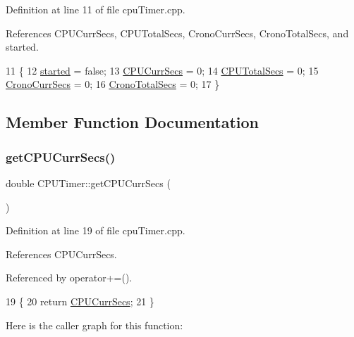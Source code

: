 Definition at line 11 of file cpu\+Timer.\+cpp.



References C\+P\+U\+Curr\+Secs, C\+P\+U\+Total\+Secs, Crono\+Curr\+Secs, Crono\+Total\+Secs, and started.


\begin{DoxyCode}
11                    \{
12     \hyperlink{class_c_p_u_timer_a8fde2f68dd2f4811400429dcf9a4a6c7}{started} = \textcolor{keyword}{false};
13     \hyperlink{class_c_p_u_timer_aa34930f260364d48351fac6f5b926c82}{CPUCurrSecs} = 0;
14     \hyperlink{class_c_p_u_timer_a1f61a2313ec71eb67d658c482420abe7}{CPUTotalSecs} = 0;
15     \hyperlink{class_c_p_u_timer_a5cd38d0e4893710f1c85f1aa03961cbc}{CronoCurrSecs} = 0;
16     \hyperlink{class_c_p_u_timer_a9c8ac2ee9f44e8b4365321698cf17493}{CronoTotalSecs} = 0;
17 \}
\end{DoxyCode}


\subsection{Member Function Documentation}
\mbox{\label{class_c_p_u_timer_a98f96656fd5e6676064ac6e5f3c7621b}} 
\subsubsection{\texorpdfstring{get\+C\+P\+U\+Curr\+Secs()}{getCPUCurrSecs()}}
{\footnotesize\ttfamily double C\+P\+U\+Timer\+::get\+C\+P\+U\+Curr\+Secs (\begin{DoxyParamCaption}{ }\end{DoxyParamCaption})}



Definition at line 19 of file cpu\+Timer.\+cpp.



References C\+P\+U\+Curr\+Secs.



Referenced by operator+=().


\begin{DoxyCode}
19                                 \{
20     \textcolor{keywordflow}{return} \hyperlink{class_c_p_u_timer_aa34930f260364d48351fac6f5b926c82}{CPUCurrSecs};
21 \}
\end{DoxyCode}
Here is the caller graph for this function\+:
\mbox{\label{class_c_p_u_timer_a3403f8cce7b7518e47a1826b8650220c}} 
